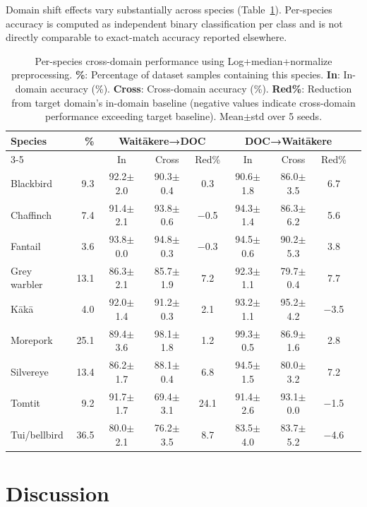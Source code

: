 \documentclass[peer-review]{fa2026}
\begin{document}
Domain shift effects vary substantially across species (Table~\ref{tab:per_species}). Per-species accuracy is computed as independent binary classification per class and is not directly comparable to exact-match accuracy reported elsewhere. 

\begin{table}[t]
\centering
\small
\caption{Per-species cross-domain performance using Log+median+normalize preprocessing. \textbf{\%}: Percentage of dataset samples containing this species. \textbf{In}: In-domain accuracy (\%). \textbf{Cross}: Cross-domain accuracy (\%). \textbf{Red\%}: Reduction from target domain's in-domain baseline (negative values indicate cross-domain performance exceeding target baseline). Mean$\pm$std over 5 seeds. }
\label{tab:per_species}
\begin{tabular}{@{}lrccccccc@{}}
\hline
Species & \% & \multicolumn{3}{c}{Wait\=akere→DOC} & \multicolumn{3}{c}{DOC→Wait\=akere} \\
\cline{3-5} \cline{6-8}
        &    & In & Cross & Red\% & In & Cross & Red\% \\
\hline
Blackbird        &  9.3 & 92.2$\pm$2.0 & 90.3$\pm$0.4 & 0.3 & 90.6$\pm$1.8 & 86.0$\pm$3.5 & 6.7 \\
Chaffinch        &  7.4 & 91.4$\pm$2.1 & 93.8$\pm$0.6 & $-$0.5 & 94.3$\pm$1.4 & 86.3$\pm$6.2 & 5.6 \\
Fantail          &  3.6 & 93.8$\pm$0.0 & 94.8$\pm$0.3 & $-$0.3 & 94.5$\pm$0.6 & 90.2$\pm$5.3 & 3.8 \\
Grey warbler     & 13.1 & 86.3$\pm$2.1 & 85.7$\pm$1.9 & 7.2 & 92.3$\pm$1.1 & 79.7$\pm$0.4 & 7.7 \\
K\=ak\=a         &  4.0 & 92.0$\pm$1.4 & 91.2$\pm$0.3 & 2.1 & 93.2$\pm$1.1 & 95.2$\pm$4.2 & $-$3.5 \\
Morepork         & 25.1 & 89.4$\pm$3.6 & 98.1$\pm$1.8 & 1.2 & 99.3$\pm$0.5 & 86.9$\pm$1.6 & 2.8 \\
Silvereye        & 13.4 & 86.2$\pm$1.7 & 88.1$\pm$0.4 & 6.8 & 94.5$\pm$1.5 & 80.0$\pm$3.2 & 7.2 \\
Tomtit           &  9.2 & 91.7$\pm$1.7 & 69.4$\pm$3.1 & 24.1 & 91.4$\pm$2.6 & 93.1$\pm$0.0 & $-$1.5 \\
Tui/bellbird     & 36.5 & 80.0$\pm$2.1 & 76.2$\pm$3.5 & 8.7 & 83.5$\pm$4.0 & 83.7$\pm$5.2 & $-$4.6 \\
\hline
\end{tabular}
\end{table}

\section{Discussion}
\end{document}
